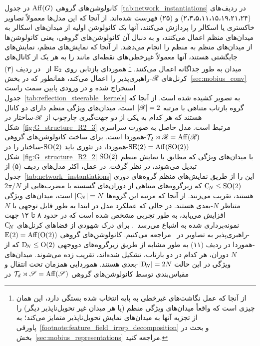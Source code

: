 کانولوشن‌های گروهی $\operatorname{Aff}(G)$ در جدول~\ref{tab:network_instantiations} در ردیف‌های (۲،۳،۵،۱۱،۱۵،۱۹،۲۱،۲۴) و (۲۵) فهرست شده‌اند.
از آنجا که این مدل‌ها معمولاً تصاویر خاکستری یا اسکالر را پردازش می‌کنند، آنها یک کانولوشن اولیه از میدان‌های اسکالر به میدان‌های منظم اعمال می‌کنند، و به دنبال آن کانولوشن‌های گروهی، یعنی کانولوشن‌ها از میدان‌های منظم به منظم را انجام می‌دهند.
از آنجا که نمایش‌های منظم، نمایش‌های جایگشتی هستند، آنها معمولاً غیرخطی‌های نقطه‌ای مانند  را به هر یک از کانال‌های میدان به طور جداگانه اعمال می‌کنند.%
\footnote{
	از آنجا که عمل نگاشت‌های غیرخطی به پایه انتخاب شده بستگی دارد، این همان چیزی است که واقعاً میدان‌های ویژگی منظم (یا هر میدان غیر تحویل‌ناپذیر دیگر) را از تجزیه آنها به میدان‌های نمایش تحویل‌ناپذیر متمایز می‌کند؛ به پاورقی~\ref{footnote:feature_field_irrep_decomposition} و بحث در بخش~\ref{sec:mobius_representations} مراجعه کنید.
}
 هموردای بازتابی روی $\mathbb{E}_2$ از~\cite{Weiler2019_E2CNN} در 
ردیف (۳)
کرنل‌های $\mathscr{R}$-راهبری‌پذیر را اعمال می‌کند، همانطور که در بخش~\ref{sec:mobius_conv} استخراج شده و در ورودی پایین سمت راست جدول~\ref{tab:reflection_steerable_kernels} به تصویر کشیده شده است.
از آنجا که گروه بازتاب متناهی با مرتبه $|\mathscr{R}| = 2$ است، میدان‌های ویژگی منظم دارای دو کانال هستند که هر کدام به یکی از دو جهت‌گیری چارچوب از $\mathscr{R}$-ساختار در شکل~\ref{fig:G_structure_R2_3} مرتبط است.
مدل حاصل به صورت سراسری $\mathcal{T}_2 \rtimes \mathscr{R} = \operatorname{Aff}(\mathscr{R})$-هموردا است.
%
برای ساخت کانولوشن‌های گروهی $\operatorname{SE}(2) = \operatorname{Aff}(\operatorname{SO}(2))$-هموردا، در تئوری باید $\operatorname{SO}(2)$-ساختار را در شکل~\ref{fig:G_structure_R2_2} با میدان‌های ویژگی که مطابق با نمایش منظم $\operatorname{SO}(2)$ تبدیل می‌شوند، در نظر گرفت.
در عمل، اکثر مدل‌های 
ردیف (۵)
از جدول~\ref{tab:network_instantiations}
این را از طریق نمایش‌های منظم گروه‌های دوری $\operatorname{C}_{\!N} \leq \operatorname{SO}(2)$ که زیرگروه‌های متناهی از دوران‌های گسسته با مضرب‌هایی از $2\pi/N$ هستند، تقریب می‌زنند.
از آنجا که مرتبه این گروه‌ها $|\!\operatorname{C}_{\!N}\!|=N$ است، میدان‌های ویژگی متناظر $N$-بعدی هستند.
در حالی که عملکرد مدل در ابتدا به طور قابل توجهی با $N$ افزایش می‌یابد، به طور تجربی مشخص شده است که در حدود ۸ تا ۱۲ جهت نمونه‌برداری شده به اشباع می‌رسد~\cite{Weiler2018SFCNN,Weiler2019_E2CNN,bekkers2020bspline}.
برای درک شهودی از فضاهای کرنل‌های $\operatorname{C}_{\!N}$-راهبری‌پذیر به تصاویر در~\cite{Weiler2018SFCNN,bekkers2018roto,bekkers2020bspline} مراجعه می‌کنیم.
%
کانولوشن‌های گروهی $\operatorname{E}(2) = \operatorname{Aff}(\operatorname{O}(2))$-هموردا در 
ردیف (۱۱)
به طور مشابه از طریق زیرگروه‌های دووجهی $\operatorname{D}_{\!N} \leq \operatorname{O}(2)$ که از $N$ دوران، هر کدام در دو بازتاب، تشکیل شده‌اند، تقریب زده می‌شوند.
میدان‌های ویژگی در این حالت $|\!\operatorname{D}_{\!N}\!| = 2N$-بعدی هستند.
%
هموردایی همزمان تحت انتقال و مقیاس‌بندی توسط کانولوشن‌های گروهی $\mathcal{T}_d \rtimes \mathscr{S} = \operatorname{Aff}(\mathscr{S})$ در
